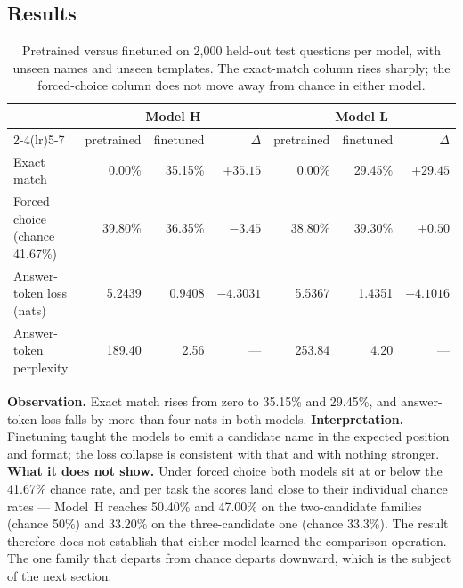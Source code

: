 \documentclass[10pt]{article}
\begin{document}
\subsection{Results}

\begin{table}[!htb]
\centering\small
\caption{Pretrained versus finetuned on 2{,}000 held-out test questions per model,
with unseen names and unseen templates. The exact-match column rises sharply; the
forced-choice column does not move away from chance in either model.}
\label{tab:reasoning}
\begin{tabular}{lrrr@{\hskip 20pt}rrr}
\toprule
& \multicolumn{3}{c}{\textbf{Model H}} & \multicolumn{3}{c}{\textbf{Model L}} \\
\cmidrule(lr){2-4}\cmidrule(lr){5-7}
& pretrained & finetuned & $\Delta$ & pretrained & finetuned & $\Delta$ \\
\midrule
Exact match & 0.00\% & 35.15\% & $+35.15$ & 0.00\% & 29.45\% & $+29.45$ \\
Forced choice (chance 41.67\%) & 39.80\% & 36.35\% & $-3.45$ & 38.80\% & 39.30\% & $+0.50$ \\
Answer-token loss (nats) & 5.2439 & 0.9408 & $-4.3031$ & 5.5367 & 1.4351 & $-4.1016$ \\
Answer-token perplexity & 189.40 & 2.56 & --- & 253.84 & 4.20 & --- \\
\bottomrule
\end{tabular}
\end{table}

\textbf{Observation.} Exact match rises from zero to 35.15\% and 29.45\%, and
answer-token loss falls by more than four nats in both models.
\textbf{Interpretation.} Finetuning taught the models to emit a candidate name in the
expected position and format; the loss collapse is consistent with that and with
nothing stronger. \textbf{What it does not show.} Under forced choice both models sit
at or below the 41.67\% chance rate, and per task the scores land close to their
individual chance rates --- Model~H reaches 50.40\% and 47.00\% on the two-candidate
families (chance 50\%) and 33.20\% on the three-candidate one (chance 33.3\%). The
result therefore does not establish that either model learned the comparison
operation. The one family that departs from chance departs downward, which is the
subject of the next section.
\end{document}
